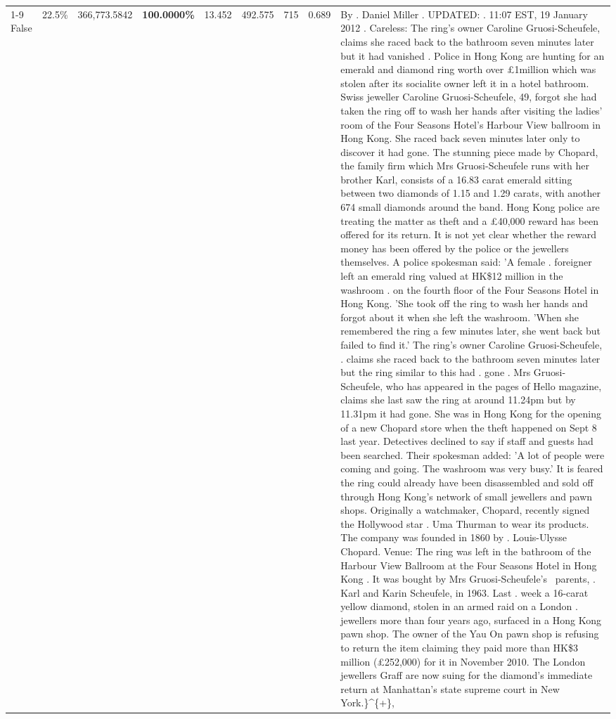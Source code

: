 \begin{table}[H]
\begin{tabular}{lllrlllll}
\cline{1-9}
False & 22.5\% & 366,773.5842 & \bfseries \color{red} 100.0000\% & 13.452 & 492.575 & 715 & 0.689 & By . Daniel Miller . UPDATED: . 11:07 EST, 19 January 2012 . Careless: The ring's owner Caroline Gruosi-Scheufele, claims she raced back to the bathroom seven minutes later but it had vanished . Police in Hong Kong are hunting for an emerald and diamond ring worth over £1million which was stolen after its socialite owner left it in a hotel bathroom. Swiss jeweller Caroline Gruosi-Scheufele, 49, forgot she had taken the ring off to wash her hands after visiting the ladies' room of the Four Seasons Hotel's Harbour View ballroom in Hong Kong. She raced back seven minutes later only to discover it had gone. The stunning piece made by Chopard, the family firm which Mrs Gruosi-Scheufele runs with her brother Karl, consists of a 16.83 carat emerald sitting between two diamonds of 1.15 and 1.29 carats, with another 674 small diamonds around the band. Hong Kong police are treating the matter as theft and a £40,000 reward has been offered for its return. It is not yet clear whether the reward money has been offered by the police or the jewellers themselves. A police spokesman said: 'A female . foreigner left an emerald ring valued at HK\$12 million in the washroom . on the fourth floor of the Four Seasons Hotel in Hong Kong. 'She took off the ring to wash her hands and forgot about it when she left the washroom. 'When she remembered the ring a few minutes later, she went back but failed to find it.' The ring's owner Caroline Gruosi-Scheufele, . claims she raced back to the bathroom seven minutes later but the ring similar to this had . gone . Mrs Gruosi-Scheufele, who has appeared in the pages of Hello magazine, claims she last saw the ring at around 11.24pm but by 11.31pm it had gone. She was in Hong Kong for the opening of a new Chopard store when the theft happened on Sept 8 last year. Detectives declined to say if staff and guests had been searched. Their spokesman added: 'A lot of people were coming and going. The washroom was very busy.' It is feared the ring could already have been disassembled and sold off through Hong Kong's network of small jewellers and pawn shops. Originally a watchmaker, Chopard, recently signed the Hollywood star . Uma Thurman to wear its products. The company was founded in 1860 by . Louis-Ulysse Chopard. Venue: The ring was left in the bathroom of the Harbour View Ballroom at the Four Seasons Hotel in Hong Kong . It was bought by Mrs Gruosi-Scheufele's  parents, . Karl and Karin Scheufele, in 1963. Last . week a 16-carat yellow diamond, stolen in an armed raid on a London . jewellers more than four years ago, surfaced in a Hong Kong pawn shop. The owner of the Yau On pawn shop is refusing to return the item claiming they paid more than HK\$3 million (£252,000) for it in November 2010. The London jewellers Graff are now suing for the diamond’s immediate return at Manhattan’s state supreme court in New York.\}\textasciicircum \{+\}, \\

\end{tabular}
\end{table}
